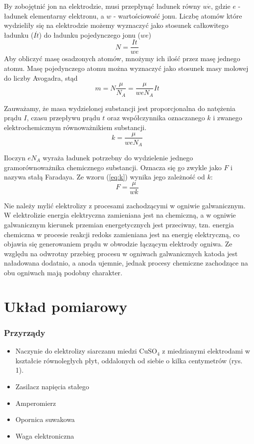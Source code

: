 \documentclass[a4paper,11pt]{article}
\begin{document}
By zobojętnić jon na elektrodzie, musi przepłynąć ładunek równy $w\dot e$, gdzie $e$ - ładunek elementarny elektronu, a $w$ - wartościowość jonu.
Liczbę atomów które wydzieliły się na elektrodzie możemy wyznaczyć jako stosunek całkowitego ładunku ($I\dot t$) do ładunku pojedynczego jonu ($we$)
\begin{equation}
N=\frac{It}{we}
\end{equation}
Aby obliczyć masę osadzonych atomów, mnożymy ich ilość przez masę jednego atomu. Masę pojedynczego atomu można wyznaczyć jako stosunek masy molowej do
liczby Avogadra, stąd
\begin{equation}
\label{eq:masa}
m=N\frac{\mu}{N_A}=\frac{\mu}{weN_A}It
\end{equation}

Zauważamy, że masa wydzielonej substancji jest proporcjonalna do natężenia prądu $I$, czasu przepływu prądu $t$ oraz współczynnika oznaczanego $k$ i zwanego elektrochemicznym równoważnikiem substancji.
\begin{equation}
\label{eq:k}
k=\frac{\mu}{weN_A}
\end{equation}


Iloczyn $eN_A$ wyraża ładunek potrzebny do wydzielenie jednego gramorównoważnika chemicznego substancji. Oznacza się go zwykle jako $F$ i nazywa stałą Faradaya.
Ze wzoru (\ref{eq:k}) wynika jego zależność od $k$:
\begin{equation}
F=\frac{\mu}{wk}
\end{equation}

Nie należy mylić elektrolizy z procesami zachodzącymi w ogniwie galwanicznym. W elektrolizie energia elektryczna zamieniana jest na chemiczną, a w ogniwie galwanicznym kierunek przemian energetycznych jest przeciwny, tzn. energia chemiczna w procesie reakcji redoks zamieniana jest na energię elektryczną, co objawia się generowaniem prądu w obwodzie łączącym elektrody ogniwa. Ze względu na odwrotny przebieg procesu w ogniwach galwanicznych katoda jest naładowana dodatnio, a anoda ujemnie, jednak procesy chemiczne zachodzące na obu ogniwach mają podobny charakter.

\section{Układ pomiarowy}


\subsubsection*{Przyrządy}
\begin{itemize}
\item Naczynie do elektrolizy siarczanu miedzi $\text{CuSO}_4$ z miedzianymi elektrodami w kształcie
równoległych płyt, oddalonych od siebie o kilka centymetrów (rys. 1).
\item Zasilacz napięcia stałego
\item Amperomierz
\item Opornica suwakowa
\item Waga elektroniczna
\end{itemize}
\end{document}
